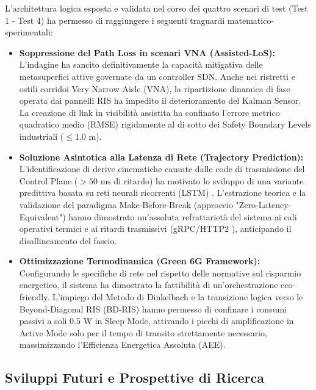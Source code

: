 \documentclass[twoside]{article}
\begin{document}
L'architettura logica esposta e validata nel corso dei quattro scenari di test (Test 1 - Test 4) ha permesso di raggiungere i seguenti traguardi matematico-sperimentali:
\begin{itemize}
    \item \textbf{Soppressione del Path Loss in scenari VNA (Assisted-LoS):} L'indagine ha sancito definitivamente la capacità mitigativa delle metasuperfici attive governate da un controller SDN. Anche nei ristretti e ostili corridoi Very Narrow Aisle (VNA), la ripartizione dinamica di fase operata dai pannelli RIS \cite{Zhang2022} ha impedito il deterioramento del Kalman Sensor. La creazione di link in visibilità assistita ha confinato l'errore metrico quadratico medio (RMSE) rigidamente al di sotto dei Safety Boundary Levels industriali ($\leq 1.0\text{ m}$).
    \item \textbf{Soluzione Asintotica alla Latenza di Rete (Trajectory Prediction):} L'identificazione di derive cinematiche causate dalle code di trasmissione del Control Plane ($>50\text{ ms}$ di ritardo) ha motivato lo sviluppo di una variante predittiva basata su reti neurali ricorrenti (LSTM) \cite{Wang2024}. L'estrazione teorica e la validazione del paradigma Make-Before-Break (approccio "Zero-Latency-Equivalent") hanno dimostrato un'assoluta refrattarietà del sistema ai cali operativi termici e ai ritardi trasmissivi (gRPC/HTTP2 \cite{Vairam2023}), anticipando il disallineamento del fascio.
    \item \textbf{Ottimizzazione Termodinamica (Green 6G Framework):} Configurando le specifiche di rete nel rispetto delle normative sul risparmio energetico, il sistema ha dimostrato la fattibilità di un'orchestrazione eco-friendly. L'impiego del Metodo di Dinkelbach e la transizione logica verso le Beyond-Diagonal RIS (BD-RIS) \cite{Khan2024} hanno permesso di confinare i consumi passivi a soli 0.5 W in Sleep Mode, attivando i picchi di amplificazione in Active Mode solo per il tempo di transito strettamente necessario, massimizzando l'Efficienza Energetica Assoluta (AEE).
\end{itemize}

\subsection{Sviluppi Futuri e Prospettive di Ricerca}
\end{document}
